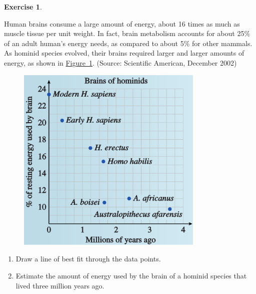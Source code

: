 \documentclass[10pt,]{book}
\theoremstyle{plain}
\theoremstyle{definition}
\newtheorem{exercise}[theorem]{Exercise}
\theoremstyle{definition}
\numberwithin{equation}{section}
\begin{document}
\begin{exercise}\label{hominid-brains}

    Human brains consume a large amount of energy, about 16 times as much as muscle tissue per unit weight. In fact, brain metabolism accounts for about 25\% of an adult human’s energy needs, as compared to about 5\% for other mammals. As hominid species evolved, their brains required larger and larger amounts of energy, as shown in \hyperref[fig-hominid-brains]{Figure~\ref{fig-hominid-brains}}. (Source: Scientific American, December 2002)
\leavevmode%
\begin{figure}
\centering
\includegraphics[width=0.80\textwidth,]{images/fig-hominid-brains.svg}\caption{\label{fig-hominid-brains}}
\end{figure}
\leavevmode%
\begin{enumerate}[label=*\alph**]
\item\hypertarget{li-197}{}Draw a line of best fit through the data points.\item\hypertarget{li-198}{}Estimate the amount of energy used by the brain of a hominid species that lived three million years ago.\end{enumerate}
\end{exercise}
\par
\end{document}
